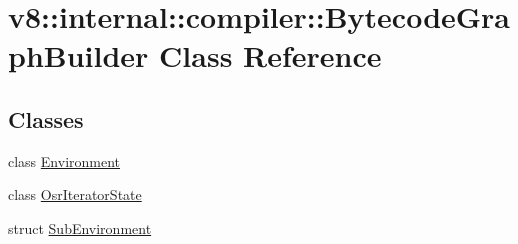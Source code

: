 \hypertarget{classv8_1_1internal_1_1compiler_1_1BytecodeGraphBuilder}{}\section{v8\+:\+:internal\+:\+:compiler\+:\+:Bytecode\+Graph\+Builder Class Reference}
\label{classv8_1_1internal_1_1compiler_1_1BytecodeGraphBuilder}
\subsection*{Classes}
\begin{DoxyCompactItemize}
\item 
class \mbox{\hyperlink{classv8_1_1internal_1_1compiler_1_1BytecodeGraphBuilder_1_1Environment}{Environment}}
\item 
class \mbox{\hyperlink{classv8_1_1internal_1_1compiler_1_1BytecodeGraphBuilder_1_1OsrIteratorState}{Osr\+Iterator\+State}}
\item 
struct \mbox{\hyperlink{structv8_1_1internal_1_1compiler_1_1BytecodeGraphBuilder_1_1SubEnvironment}{Sub\+Environment}}
\end{DoxyCompactItemize}
